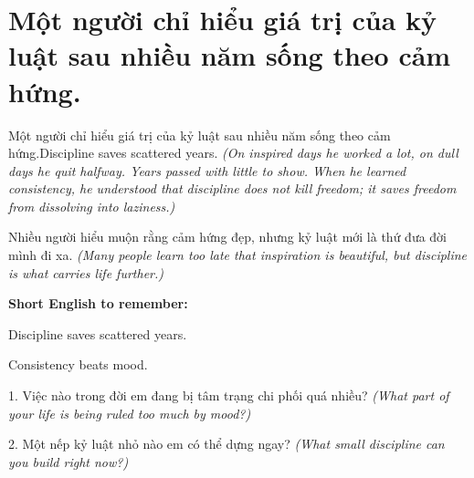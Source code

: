 \section{Một người chỉ hiểu giá trị của kỷ luật sau nhiều năm sống theo cảm hứng.}
\begin{truyen}{Một người chỉ hiểu giá trị của kỷ luật sau nhiều năm sống theo cảm hứng.}{Discipline saves scattered years.}
\textit{(On inspired days he worked a lot, on dull days he quit halfway. Years passed with little to show. When he learned consistency, he understood that discipline does not kill freedom; it saves freedom from dissolving into laziness.)}
\end{truyen}
\begin{baihoc}
Nhiều người hiểu muộn rằng cảm hứng đẹp, nhưng kỷ luật mới là thứ đưa đời mình đi xa.
\textit{(Many people learn too late that inspiration is beautiful, but discipline is what carries life further.)}
\end{baihoc}
\begin{ghinhoanh}
\textbf{Short English to remember:}

Discipline saves scattered years.

Consistency beats mood.
\end{ghinhoanh}
\begin{tuhocnhanh}
1. Việc nào trong đời em đang bị tâm trạng chi phối quá nhiều? \textit{(What part of your life is being ruled too much by mood?)}

2. Một nếp kỷ luật nhỏ nào em có thể dựng ngay? \textit{(What small discipline can you build right now?)}
\end{tuhocnhanh}
\ngancach

